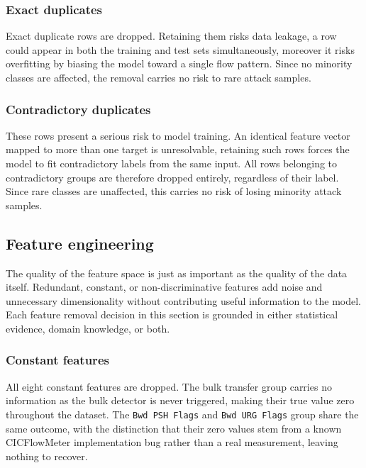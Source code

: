 \subsubsection{Exact duplicates}

Exact duplicate rows are dropped. Retaining them risks data leakage, a row could appear in both the training and test sets simultaneously, moreover it risks overfitting by biasing the model toward a single flow pattern. Since no minority classes are affected, the removal carries no risk to rare attack samples.

\subsubsection{Contradictory duplicates}

These rows present a serious risk to model training.
An identical feature vector mapped to more than one target is unresolvable, retaining such rows forces the model to fit contradictory labels from the same input. All rows belonging to contradictory groups are therefore dropped entirely, regardless of their label. Since rare classes are unaffected, this carries no risk of losing minority attack samples.

\vspace{-0.5cm}
\subsection{Feature engineering}

The quality of the feature space is just as important as the quality of the data itself. Redundant, constant, or non-discriminative features add noise and unnecessary dimensionality without contributing useful information to the model. Each feature removal decision in this section is grounded in either statistical evidence, domain knowledge, or both.


\subsubsection{Constant features}

All eight constant features are dropped. The bulk transfer group carries no information as the bulk detector is never triggered, making their true value zero throughout the dataset. The \texttt{Bwd PSH Flags} and \texttt{Bwd URG Flags} group share the same outcome, with the distinction that their zero values stem from a known CICFlowMeter implementation bug rather than a real measurement, leaving nothing to recover.

